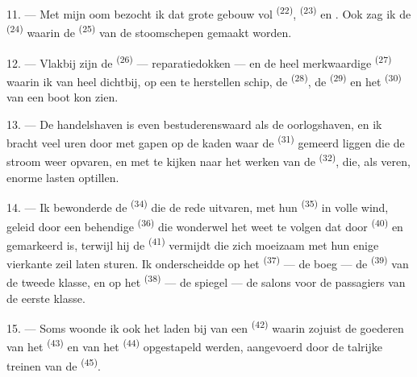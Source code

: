 \VUsaut{3.0mm}
\VUsaut{3.0mm}

11. --- Met mijn oom bezocht ik dat grote gebouw vol  \textsuperscript{(22)},
 \textsuperscript{(23)} en
. Ook zag ik de 
\textsuperscript{(24)} waarin de  \textsuperscript{(25)} van de stoomschepen
gemaakt worden.

12. --- Vlakbij zijn de  \textsuperscript{(26)} --- reparatiedokken --- en de
heel merkwaardige  \textsuperscript{(27)} waarin ik van heel
dichtbij, op een te herstellen schip, de  \textsuperscript{(28)}, de
 \textsuperscript{(29)} en het  \textsuperscript{(30)} van een boot
kon zien.

13. --- De handelshaven is even bestuderenswaard als de oorlogshaven, en ik bracht veel uren
door met gapen op de kaden waar de  \textsuperscript{(31)} gemeerd liggen
die de stroom weer opvaren, en met te kijken naar het werken van de 
\textsuperscript{(32)}, die, als veren, enorme lasten optillen.

\VUsaut{4.0mm}
\VUsaut{3.0mm}

14. --- Ik bewonderde de  \textsuperscript{(34)} die de rede
uitvaren, met hun  \textsuperscript{(35)} in volle wind, geleid door een
behendige  \textsuperscript{(36)} die wonderwel het  weet te
volgen dat door  \textsuperscript{(40)} en  gemarkeerd is,
terwijl hij de  \textsuperscript{(41)} vermijdt die zich moeizaam met hun
enige vierkante zeil laten sturen. Ik onderscheidde op het
 \textsuperscript{(37)} --- de boeg --- de 
\textsuperscript{(39)} van de tweede klasse, en op het 
\textsuperscript{(38)} --- de spiegel --- de salons voor de passagiers van de eerste klasse.

15. --- Soms woonde ik ook het laden bij van een  \textsuperscript{(42)}
waarin zojuist de goederen van het  \textsuperscript{(43)} en van het
 \textsuperscript{(44)} opgestapeld werden, aangevoerd door de talrijke
treinen van de
 \textsuperscript{(45)}.

